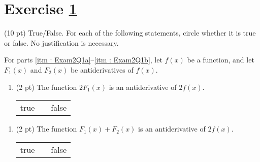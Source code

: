 %
%
%
%


\section{Exercise \ref{sec : Math112 Spring2022 MockExam2 Q1}}
\label{sec : Math112 Spring2022 MockExam2 Q1}

(10 pt) True/False. For each of the following statements, circle whether it is true or false. No justification is necessary.

\vspace{0.25in}



\noindent{}For parts \ref{itm : Exam2Q1a}--\ref{itm : Exam2Q1b}, let $f(x)$ be a function, and let $F_{1}(x)$ and $F_{2}(x)$ be antiderivatives of $f(x)$.



\begin{enumerate}[label=(\alph*)]
\item\label{itm : Exam2Q1a} (2 pt) The function $2 F_{1}(x)$ is an antiderivative of $2 f(x)$.
\begin{center}
\begin{tabular}{c c c}
true	&	\hspace{1in}	&	false
\end{tabular}
\end{center}
\end{enumerate}




\begin{enumerate}[resume,label=(\alph*)]
\item\label{itm : Exam2Q1b} (2 pt) The function $F_{1}(x) + F_{2}(x)$ is an antiderivative of $2 f(x)$.
\begin{center}
\begin{tabular}{c c c}
true	&	\hspace{1in}	&	false
\end{tabular}
\end{center}
\end{enumerate}

